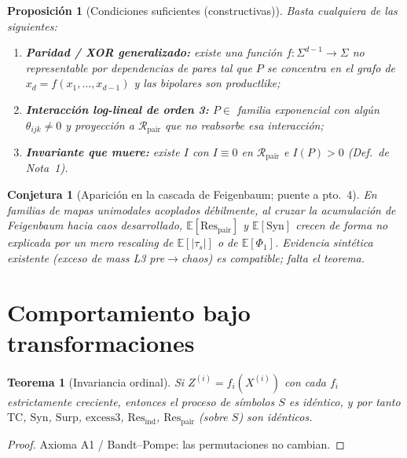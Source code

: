 \documentclass[11pt,a4paper]{article}
\theoremstyle{definition}
\theoremstyle{plain}
\newtheorem{proposition}{Proposici\'on}[section]
\newtheorem{theorem}{Teorema}[section]
\newtheorem{conjecture}{Conjetura}[section]
\theoremstyle{remark}
\newcommand{\Res}{\mathrm{Res}}
\newcommand{\TC}{\mathrm{TC}}
\newcommand{\Syn}{\mathrm{Syn}}
\newcommand{\Surp}{\mathrm{Surp}}
\newcommand{\excess}{\mathrm{excess3}}
\newcommand{\Rpair}{\mathcal{R}_{\mathrm{pair}}}
\begin{document}
\begin{proposition}[Condiciones suficientes (constructivas)]
\label{prop:suf}
Basta cualquiera de las siguientes:
\begin{enumerate}[label=(\roman*)]
  \item \textbf{Paridad / XOR generalizado:} existe una funci\'on
  $f:\Sigma^{d-1}\to\Sigma$ no representable por dependencias de pares
  tal que $P$ se concentra en el grafo de $x_d=f(x_1,\ldots,x_{d-1})$ y
  las bipolares son product\-like;
  \item \textbf{Interacci\'on log-lineal de orden 3:}
  $P\in$ familia exponencial con alg\'un $\theta_{ijk}\ne 0$ y
  proyecci\'on a $\Rpair$ que no reabsorbe esa interacci\'on;
  \item \textbf{Invariante que muere:} existe $I$ con $I\equiv 0$ en
  $\Rpair$ e $I(P)>0$ (Def.\ de Nota~1).
\end{enumerate}
\end{proposition}

\begin{conjecture}[Aparici\'on en la cascada de Feigenbaum; puente a pto.~4]
\label{conj:feigenbaum}
En familias de mapas unimodales acoplados d\'ebilmente, al cruzar la
acumulaci\'on de Feigenbaum hacia caos desarrollado,
$\mathbb{E}[\Res_{\mathrm{pair}}]$ y $\mathbb{E}[\Syn]$ crecen de forma no
explicada por un mero rescaling de $\mathbb{E}[|\tau_s|]$ o de
$\mathbb{E}[\Phi_1]$. Evidencia sint\'etica existente (exceso de mass
L3 pre$\to$chaos) es compatible; falta el teorema.
\end{conjecture}

\section{Comportamiento bajo transformaciones}
\label{sec:transforms}

\begin{theorem}[Invariancia ordinal]
\label{thm:ordinal_inv}
Si $Z^{(i)}=f_i(X^{(i)})$ con cada $f_i$ estrictamente creciente, entonces
el proceso de s\'imbolos $S$ es id\'entico, y por tanto
$\TC$, $\Syn$, $\Surp$, $\excess$, $\Res_{\mathrm{ind}}$,
$\Res_{\mathrm{pair}}$ (sobre $S$) son id\'enticos.
\end{theorem}

\begin{proof}
Axioma A1 / Bandt--Pompe: las permutaciones no cambian.
\end{proof}
\end{document}
